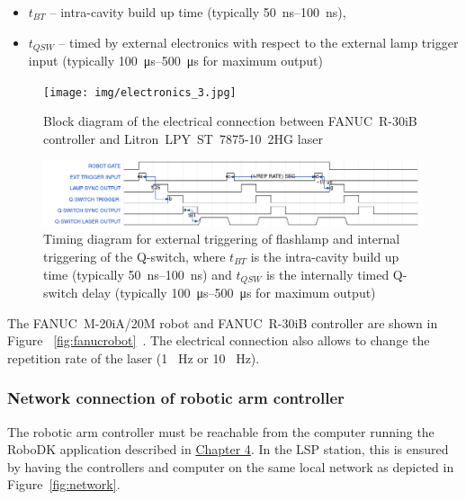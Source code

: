 \begin{itemize}
    \item $t_{BT}$ -- intra-cavity build up time (typically \SIrange{50}{100}{\ns}),
    \item $t_{QSW}$ -- timed by external electronics with respect to the external lamp trigger input (typically \SIrange{100}{500}{\us} for maximum output)

\end{itemize}


\begin{figure}[h]
    \centering
    \texttt{[image: img/electronics\_3.jpg]}
    \caption[Block diagram of the electrical connection]{Block diagram of the electrical connection between FANUC~R-30iB controller and Litron~LPY~ST~7875-10~2HG laser}
    \label{fig:electronics}
\end{figure}

\begin{figure}[h]
    \centering
    \includegraphics[width=1.0\linewidth]{img/wavedrom_bigger.png}
    \caption[Timing diagram for triggering of flashlamp and the Q-switch]{Timing diagram for external triggering of flashlamp and internal triggering of the Q-switch, where $t_{BT}$ is the intra-cavity build up time (typically \SIrange{50}{100}{\ns}) and $t_{QSW}$ is the internally timed Q-switch delay (typically \SIrange{100}{500}{\us} for maximum output)}
    \label{fig:wave}
\end{figure}
The  FANUC~M-20iA/20M robot and FANUC~R-30iB controller are shown in Figure~ \ref{fig:fanucrobot}~\cite{fanucrobotcontroller}. The electrical connection also allows to change the repetition rate of the laser (1 \SI{}{\hertz} or 10 \SI{}{\hertz}).

\subsubsection*{Network connection of robotic arm controller}


The robotic arm controller must be reachable from the computer running the RoboDK application described in \hyperref[chap:design]{Chapter 4}. In the LSP station, this is ensured by having the controllers and computer on the same local network as depicted in Figure~\ref{fig:network}. 

